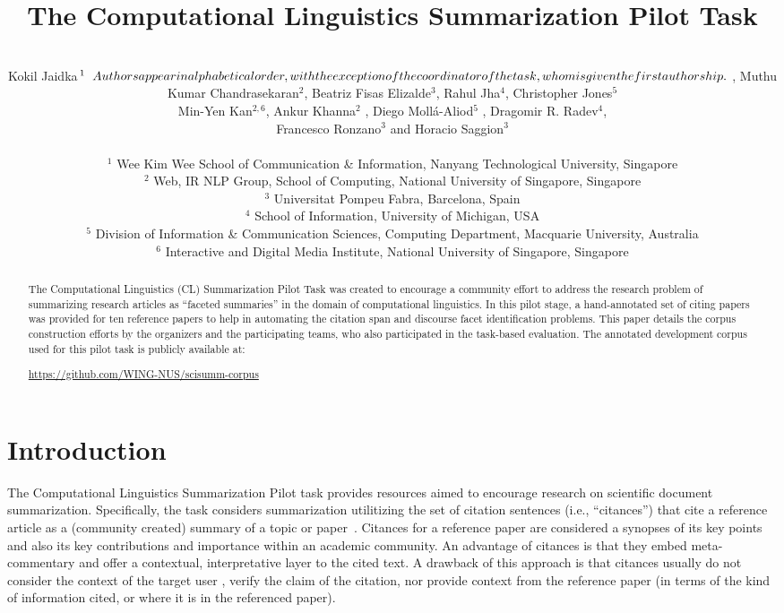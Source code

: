 \documentclass[11pt]{article}
\title{The Computational Linguistics Summarization Pilot Task}
\author{\\Kokil Jaidka$^{1}\relax{\hspace{.2cm}Authors appear in alphabetical order, with the exception of the coordinator of the task, whom is given the first authorship.} $ , Muthu Kumar Chandrasekaran$^{2}$, Beatriz Fisas Elizalde$^{3}$, Rahul Jha$^{4}$, Christopher Jones$^{5}$ \\ { Min-Yen Kan}$^{2,6}${, Ankur Khanna}$^{2}${ , Diego Moll\'{a}-Aliod}$^{5}${ , Dragomir R. Radev}$^{4}$, \\ { Francesco Ronzano}$^{3}$ and { Horacio Saggion}$^{3}$ \\ 
\\
$^1$ Wee Kim Wee School of Communication \& Information, Nanyang Technological University, Singapore \\
$^2$ Web, IR \/ NLP Group, School of Computing, National University of Singapore, Singapore \\
$^3$ Universitat Pompeu Fabra, Barcelona, Spain\\
$^4$ School of Information, University of Michigan, USA\\
$^5$ Division of Information \& Communication Sciences, Computing Department, Macquarie University, Australia \\
$^6$ Interactive and Digital Media Institute, National University of Singapore, Singapore}
\begin{document}
\maketitle
\begin{abstract}
The Computational Linguistics (CL) Summarization Pilot Task was created to encourage a community effort 
to address the research problem of summarizing research articles as ``faceted summaries'' in the domain 
of computational linguistics. In this pilot stage, a hand-annotated set of citing papers was provided for 
ten reference papers to help in automating the citation span and discourse facet identification problems.  
This paper details the corpus construction efforts by the organizers and the participating teams, who also 
participated in the task-based evaluation. The annotated development corpus used for this pilot task is 
publicly available at:
\begin{sloppypar}
\url{https://github.com/WING-NUS/scisumm-corpus}
\end{sloppypar}
\end{abstract}
\section{Introduction}

The Computational Linguistics Summarization Pilot task provides
resources aimed to encourage research on
scientific document summarization.  Specifically, the task considers
summarization utilitizing the set of citation sentences (i.e.,
``citances'') that cite a reference article as a (community created)
summary of a topic or
paper~\cite{nanba2011classification,qazvinian2010identifying}. Citances
for a reference paper are considered a synopses of its key points and
also its key contributions and importance within an academic
community. An advantage of citances is that they embed meta-commentary
and offer a contextual, interpretative layer to the cited text. A
drawback of this approach is that citances usually do not consider the
context of the target user
\cite{jones2007automatic,teufel2002summarizing}, verify the claim of
the citation, nor provide context from the reference paper (in terms of
the kind of information cited, or where it is in the referenced
paper).
\end{document}
